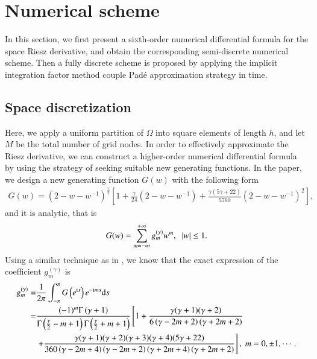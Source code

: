 \documentclass{siamart171218}
\numberwithin{theorem}{section}
\numberwithin{equation}{section}
\begin{document}
\section{Numerical scheme}
In this section, we first present a sixth-order numerical differential formula
for the space Riesz derivative, and obtain the corresponding semi-discrete numerical scheme.
Then a fully discrete scheme is proposed by applying the
implicit integration factor method couple Pad\'{e} approximation strategy in time.
\subsection{Space discretization}Here, we apply a uniform
 partition of $\Omega$ into square elements of length $h$,
and let $M$
be the total number of grid nodes.
In order to effectively approximate the Riesz derivative, we can construct a higher-order
numerical differential formula by using the strategy
 of seeking suitable new generating functions. In the paper, we design a new
 generating function $G(w)$ with the following form
\begin{equation}\label{eq.2.1}
\begin{aligned}\displaystyle
{G}(w)=\left(2-w-w^{-1}\right)^{\frac{\gamma}{2}}\left[1+\frac{\gamma}{24}
\left(2-w-w^{-1}\right)+\frac{\gamma\left(5\gamma+22\right)}{5760}
 \left(2-w-w^{-1}\right)^2\right],
\end{aligned}
\end{equation}
and it is analytic, that is
\begin{equation}\label{eq.2.2}
\begin{aligned}\displaystyle
\displaystyle{G}(w)=
\sum\limits_{m=-\infty}^{+\infty}
g_{m}^{(\gamma)}w^m,\;\;|w|\leq1.
\end{aligned}
\end{equation}
Using a similar technique as in \cite{Ding2022,Ding2023}, we know that the exact
expression of the coefficient $g_{m}^{(\gamma)}$ is
\begin{equation}\label{eq.2.3}
\begin{aligned}\displaystyle
g_{m}^{(\gamma)}=
&\displaystyle\frac{1}{2\pi}\int^{\pi}_{-\pi}
{G}\left(e^{\mathrm{i}s}\right)
e^{-\mathrm{i}ms}\mathrm{d}s\vspace{0.4cm}\\
=&\displaystyle
\frac{(-1)^m \Gamma\left(\gamma+1\right)}
{\Gamma\left(\frac{\gamma}{2}-m+1\right)\Gamma\left(\frac{\gamma}{2}+m+1\right)}
\left[1+\frac{\gamma(\gamma+1)(\gamma+2)}{6\left(\gamma-2m+2\right)
\left(\gamma+2m+2\right)}\right.\vspace{0.2cm}\\
&\displaystyle \left.+\frac{\gamma(\gamma+1)(\gamma+2)(\gamma+3)(\gamma+4)(5\gamma+22)}
{360\left(\gamma-2m+4\right)\left(\gamma-2m+2\right)
\left(\gamma+2m+4\right)\left(\gamma+2m+2\right)}
\right],\;m=0,\pm1,\cdots.
\end{aligned}
\end{equation}
\end{document}
